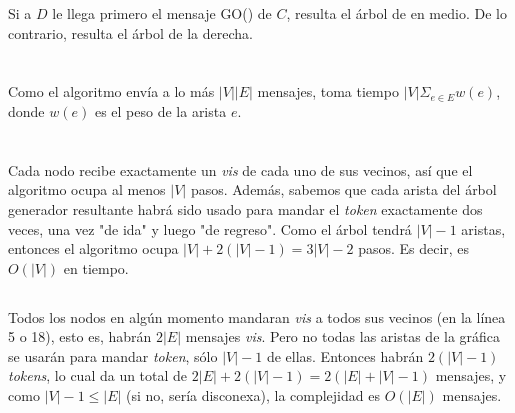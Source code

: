 \documentclass{article}
\begin{document}
Si a $D$ le llega primero el mensaje GO() de $C$, resulta el árbol de en medio. De lo contrario, resulta el árbol de la derecha.

\section{}

Como el algoritmo envía a lo más $|V||E|$ mensajes, toma tiempo $|V| \Sigma_{e \in E} w(e)$, donde $w(e)$ es el peso de la arista $e$.

\section{}

\subsection{}
Cada nodo recibe exactamente un \textit{vis} de cada uno de sus vecinos, así que
 el algoritmo ocupa al menos $|V|$ pasos. Además, sabemos que cada arista del árbol generador resultante habrá sido usado para mandar el \textit{token} exactamente dos veces, una vez "de ida" y luego "de regreso". Como el árbol tendrá $|V| - 1$ aristas, entonces el algoritmo ocupa $|V| + 2(|V| - 1) = 3|V| - 2$ pasos. Es decir, es $O(|V|)$ en tiempo.
 
 \subsection{}
 Todos los nodos en algún momento mandaran \textit{vis} a todos sus vecinos (en la línea 5 o 18), esto es, habrán $2|E|$ mensajes \textit{vis}. Pero no todas las aristas de la gráfica se usarán para mandar \textit{token}, sólo $|V| - 1$ de ellas. Entonces habrán $2(|V| - 1)$ \textit{tokens}, lo cual da un total de $2|E| + 2(|V| - 1) = 2(|E| + |V| - 1)$ mensajes, y como $|V| - 1 \leq |E|$ (si no, sería disconexa), la complejidad es $O(|E|)$ mensajes.
 
\end{document}

